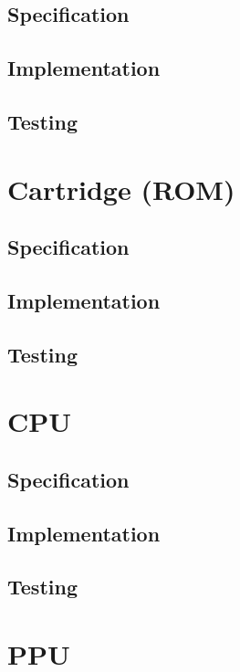 \documentclass[]{report}
\begin{document}
\subsection{Specification}

\subsection{Implementation}

\subsection{Testing}

\section{Cartridge (ROM)}

\subsection{Specification}

\subsection{Implementation}

\subsection{Testing}

\section{CPU}

\subsection{Specification}

\subsection{Implementation}

\subsection{Testing}

\section{PPU}
\end{document}
